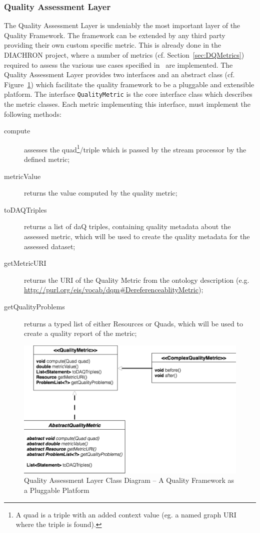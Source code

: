 \subsubsection{Quality Assessment Layer}
\label{sec:qaLayer}
The Quality Assessment Layer is undeniably the most important layer of the Quality Framework.
The framework can be extended by any third party providing their own custom specific metric.
This is already done in the DIACHRON project, where a number of metrics (cf. Section~\ref{sec:DQMetrics}) required to assess the various use cases specified in~\cite{diachron-d5.1} are implemented.
The Quality Assessment Layer provides two interfaces and an abstract class (cf. Figure~\ref{fig:classDiagram}) which facilitate the quality framework to be a pluggable and extensible platform.
The interface \texttt{QualityMetric} is the core interface class which describes the metric classes.
Each metric implementing this interface, must implement the following methods:
\begin{description}
\item[compute] assesses the quad\footnote{A quad is a triple with an added context value (eg. a named graph URI where the triple is found).}/triple which is passed by the stream processor by the defined metric;
\item[metricValue] returns the value computed by the quality metric;
\item[toDAQTriples] returns a list of daQ triples, containing quality metadata about the assessed metric, which  will be used to create the quality metadata for the assessed dataset;
\item[getMetricURI] returns the URI of the Quality Metric from the ontology description (e.g. \url{http://purl.org/eis/vocab/dqm#DereferenceablityMetric});
\item[getQualityProblems] returns a typed list of either Resources or Quads, which will be used to create a quality report of the metric;
\end{description}

\begin{figure}[tbph]
\center
\includegraphics[scale=0.3]{images/classdiagram.pdf} 
\caption{Quality Assessment Layer Class Diagram – A Quality Framework as a Pluggable Platform} 
\label{fig:classDiagram}
\end{figure}

